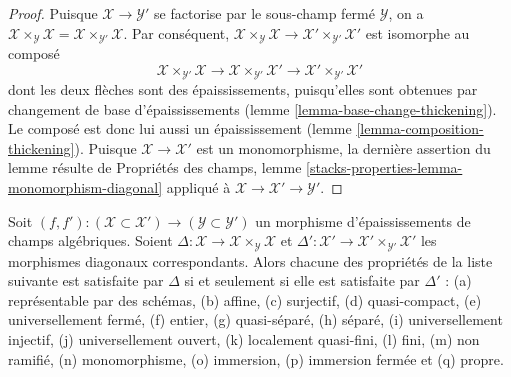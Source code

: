 \begin{proof}
Puisque $\mathcal{X} \to \mathcal{Y}'$ se factorise par le
sous-champ fermé $\mathcal{Y}$, on a
$\mathcal{X} \times_\mathcal{Y} \mathcal{X} =
\mathcal{X} \times_{\mathcal{Y}'} \mathcal{X}$.
Par conséquent,
$\mathcal{X} \times_\mathcal{Y} \mathcal{X} \to
\mathcal{X}' \times_{\mathcal{Y}'} \mathcal{X}'$
est isomorphe au composé
$$
\mathcal{X} \times_{\mathcal{Y}'} \mathcal{X} \to
\mathcal{X} \times_{\mathcal{Y}'} \mathcal{X}' \to
\mathcal{X}' \times_{\mathcal{Y}'} \mathcal{X}'
$$
dont les deux flèches sont des épaississements, puisqu'elles sont obtenues par changement de base
d'épaississements (lemme \ref{lemma-base-change-thickening}).
Le composé est donc lui aussi un épaississement
(lemme \ref{lemma-composition-thickening}).
Puisque $\mathcal{X} \to \mathcal{X}'$ est un monomorphisme,
la dernière assertion du lemme résulte de
Propriétés des champs, lemme
\ref{stacks-properties-lemma-monomorphism-diagonal}
appliqué à $\mathcal{X} \to \mathcal{X}' \to \mathcal{Y}'$.
\end{proof}

\begin{lemma}
\label{lemma-thickening-diagonals}
Soit $(f, f') : (\mathcal{X} \subset \mathcal{X}') \to
(\mathcal{Y} \subset \mathcal{Y}')$ un morphisme d'épaississements
de champs algébriques.
Soient $\Delta : \mathcal{X} \to \mathcal{X} \times_\mathcal{Y} \mathcal{X}$ et
$\Delta' : \mathcal{X}' \to \mathcal{X}' \times_{\mathcal{Y}'} \mathcal{X}'$
les morphismes diagonaux correspondants.
Alors chacune des propriétés de la liste suivante est satisfaite par $\Delta$ si
et seulement si elle est satisfaite par $\Delta'$ :
(a) représentable par des schémas, (b) affine, (c) surjectif, (d) quasi-compact,
(e) universellement fermé, (f) entier, (g) quasi-séparé, (h) séparé,
(i) universellement injectif, (j) universellement ouvert, (k) localement quasi-fini,
(l) fini, (m) non ramifié, (n) monomorphisme, (o) immersion,
(p) immersion fermée et (q) propre.
\end{lemma}


